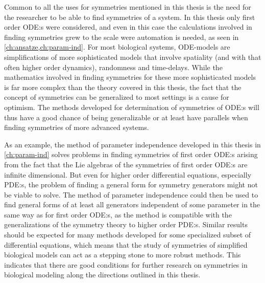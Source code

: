 Common to all the uses for symmetries mentioned in this thesis is the need for the researcher to be able to find symmetries of a system.
In this thesis only first order ODE:s were considered, and even in this case the calculations involved in finding symmetries grew to the scale were automation is needed, as seen in \cref{ch:ansatze,ch:param-ind}.
For most biological systems, ODE-models are simplifications of more sophisticated models that involve spatiality (and with that often higher order dynamics), randomness and time-delays.
While the mathematics involved in finding symmetries for these more sophisticated models is far more complex than the theory covered in this thesis, the fact that the concept of symmetries can be generalized to most settings is a cause for optimism.
The methods developed for determination of symmetries of ODE:s will thus have a good chance of being generalizable or at least have parallels when finding symmetries of more advanced systems.

As an example, the method of parameter independence developed in this thesis in \cref{ch:param-ind} solves problems in finding symmetries of first order ODE:s arising from the fact that the Lie algebras of the symmetries of first order ODE:s are infinite dimensional.
But even for higher order differential equations, especially PDE:s, the problem of finding a general form for symmetry generators might not be viable to solve.
The method of parameter independence could then be used to find general forms of at least all generators independent of some parameter in the same way as for first order ODE:s, as the method is compatible with the generalizations of the symmetry theory to higher order PDE:s.
Similar results should be expected for many methods developed for some specialized subset of differential equations, which means that the study of symmetries of simplified biological models can act as a stepping stone to more robust methods.
This indicates that there are good conditions for further research on symmetries in biological modeling along the directions outlined in this thesis.
